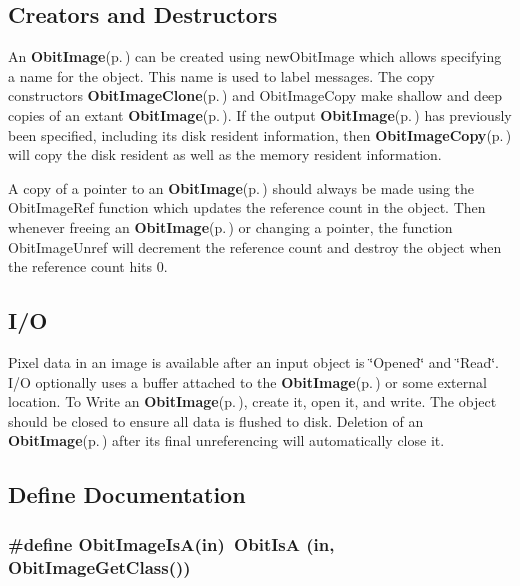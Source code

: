 \subsection{Creators and Destructors}\label{ObitImage_8h_ObitImageaccess}
An {\bf Obit\-Image}{\rm (p.\,\pageref{structObitImage})} can be created using new\-Obit\-Image which allows specifying a name for the object. This name is used to label messages. The copy constructors {\bf Obit\-Image\-Clone}{\rm (p.\,\pageref{ObitImage_8c_a17})} and Obit\-Image\-Copy make shallow and deep copies of an extant {\bf Obit\-Image}{\rm (p.\,\pageref{structObitImage})}. If the output {\bf Obit\-Image}{\rm (p.\,\pageref{structObitImage})} has previously been specified, including its disk resident information, then {\bf Obit\-Image\-Copy}{\rm (p.\,\pageref{ObitImage_8c_a16})} will copy the disk resident as well as the memory resident information.

A copy of a pointer to an {\bf Obit\-Image}{\rm (p.\,\pageref{structObitImage})} should always be made using the Obit\-Image\-Ref function which updates the reference count in the object. Then whenever freeing an {\bf Obit\-Image}{\rm (p.\,\pageref{structObitImage})} or changing a pointer, the function Obit\-Image\-Unref will decrement the reference count and destroy the object when the reference count hits 0.\subsection{I/O}\label{ObitImage_8h_ObitImageUsage}
Pixel data in an image is available after an input object is \char`\"{}Opened\char`\"{} and \char`\"{}Read\char`\"{}. I/O optionally uses a buffer attached to the {\bf Obit\-Image}{\rm (p.\,\pageref{structObitImage})} or some external location. To Write an {\bf Obit\-Image}{\rm (p.\,\pageref{structObitImage})}, create it, open it, and write. The object should be closed to ensure all data is flushed to disk. Deletion of an {\bf Obit\-Image}{\rm (p.\,\pageref{structObitImage})} after its final unreferencing will automatically close it.

\subsection{Define Documentation}
\subsubsection{\setlength{\rightskip}{0pt plus 5cm}\#define Obit\-Image\-Is\-A(in)\ Obit\-Is\-A (in, Obit\-Image\-Get\-Class())}\label{ObitImage_8h_a2}


